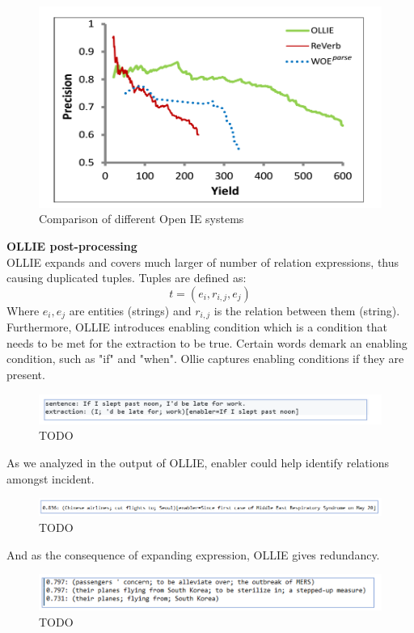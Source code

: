 \begin{figure}[h]
\centering
\includegraphics[scale= 0.35]{openie_comparison.png}
\caption{Comparison of different Open IE systems \parencite{schmitz2012open}}
\end{figure}
\textbf{OLLIE post-processing}\\
OLLIE expands and covers much larger of number of relation expressions, thus causing duplicated tuples. Tuples are defined as:
$$t = (e_i, r_{i,j}, e_j)$$
Where $e_i, e_j$ are entities (strings) and $r_{i,j}$ is the relation between them (string).
Furthermore, OLLIE introduces enabling condition which is a condition that needs to be met for the extraction to be true. Certain words demark an enabling condition, such as "if" and "when". Ollie captures enabling conditions if they are present.
\begin{figure}[h]
\centering
\includegraphics[scale= 0.35]{txt_1.png}
\caption{TODO}
\end{figure}
As we analyzed in the output of OLLIE, enabler could help identify relations amongst incident.
\begin{figure}[h]
\centering
\includegraphics[scale= 0.35]{txt_2.png}
\caption{TODO}
\end{figure}
And as the consequence of expanding expression, OLLIE gives redundancy.
\begin{figure}[h]
\centering
\includegraphics[scale= 0.35]{txt_3.png}
\caption{TODO}
\end{figure}
